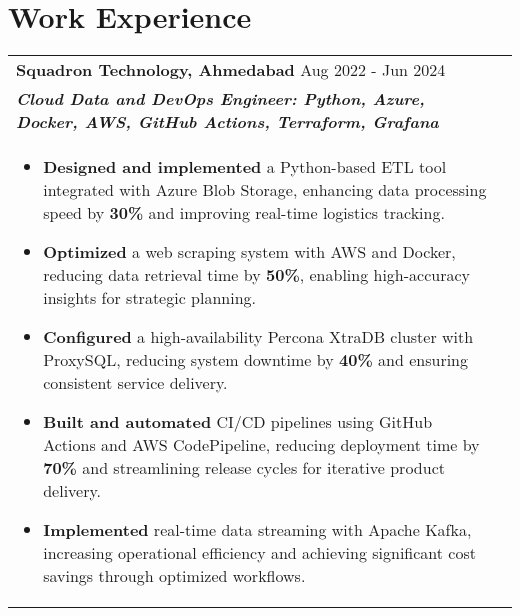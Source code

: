 \documentclass[a4paper,10pt]{article}
\begin{document}
\section{Work Experience}
\begin{tabularx}{\linewidth}{ @{}l r@{} }
\textbf{Squadron Technology, Ahmedabad} \hfill \color[HTML]{371e77} Aug 2022 - Jun 2024 \\[1pt]
\color[HTML]{371e77}\textbf{\textit{Cloud Data and DevOps Engineer: Python, Azure, Docker, AWS, GitHub Actions, Terraform, Grafana}} \\[1pt]
\begin{minipage}[t]{\linewidth}
\begin{itemize}[nosep, after=\strut, leftmargin=2em, itemsep=2pt]
\item \textbf{Designed and implemented} a Python-based ETL tool integrated with Azure Blob Storage, enhancing data processing speed by \textbf{30\%} and improving real-time logistics tracking.
\item \textbf{Optimized} a web scraping system with AWS and Docker, reducing data retrieval time by \textbf{50\%}, enabling high-accuracy insights for strategic planning.
\item \textbf{Configured} a high-availability Percona XtraDB cluster with ProxySQL, reducing system downtime by \textbf{40\%} and ensuring consistent service delivery.
\item \textbf{Built and automated} CI/CD pipelines using GitHub Actions and AWS CodePipeline, reducing deployment time by \textbf{70\%} and streamlining release cycles for iterative product delivery.
\item \textbf{Implemented} real-time data streaming with Apache Kafka, increasing operational efficiency and achieving significant cost savings through optimized workflows.
\end{itemize}
\end{minipage}

\end{tabularx}

\vspace{5pt}
\end{document}

